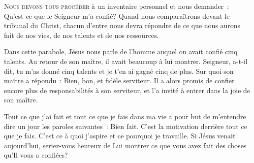 \lettrine{N}{ous devons tous procéder} à un inventaire personnel
 et nous demander~: 
 \og Qu'est-ce-que le Seigneur m'a confié? \fg{}
 Quand nous comparaîtrons devant le tribunal du Christ,
 chacun d'entre nous devra répondre de ce que nous aurons fait de nos vies,
 de nos talents et de nos ressources. 


Dans cette parabole, Jésus nous parle de l'homme auquel on avait confié
 cinq talents. Au retour de son maître, il avait beaucoup à lui montrer.
 \og Seigneur, a-t-il dit, 
 tu m'as donné cinq talents et je t'en ai gagné cinq de plus. \fg{}
 Sur quoi son maître a répondu~: 
 \og Bien, bon, et fidèle serviteur. \fg{}
 Il a alors promis de confier encore plus de responsabilités à son serviteur,
 et l'a invité à entrer dans \og la joie de son maître. \fg{}

Tout ce que j'ai fait et tout ce que je fais dans ma vie
 a pour but de m'entendre dire un jour les paroles suivantes~: 
 \og Bien fait. \fg{} 
 C'est la motivation derrière tout ce que je fais.
 C'est ce à quoi j'aspire et ce pourquoi je travaille.
 Si Jésus venait aujourd'hui, seriez-vous heureux de Lui montrer
 ce que vous avez fait des choses qu'Il vous a confiées? 

\dvrule




